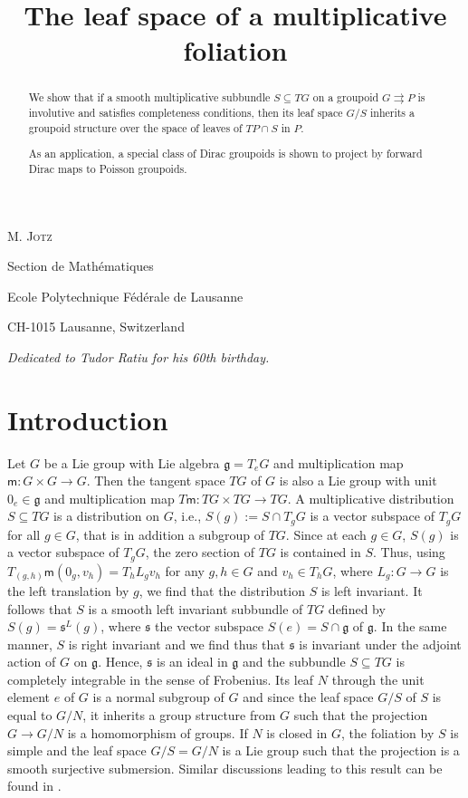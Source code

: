 \documentclass{amsart}
\title[The leaf space of a multiplicative foliation]
      {The leaf space of a multiplicative foliation}
\author[M. Jotz]{}
\theoremstyle{definition}
\begin{document}
\maketitle

\centerline{\scshape M. Jotz }
\medskip
{\footnotesize
 \centerline{Section de Math\'ematiques}
   \centerline{Ecole Polytechnique
  F{\'e}d{\'e}rale de Lausanne}
   \centerline{CH-1015 Lausanne, Switzerland}
}

\bigskip

\begin{abstract}
We show that if a smooth multiplicative subbundle
$S\subseteq TG$ on a groupoid $G{{\rightrightarrows}} P$ is involutive and  satisfies completeness conditions,
 then its leaf space
$G/S$ inherits a groupoid structure over the space  of leaves of $TP\cap S$ in $P$. 

As an application, a special class of Dirac groupoids is shown to
project by  forward Dirac maps to Poisson groupoids.
\end{abstract}

 

\begin{center}
\emph{Dedicated to Tudor Ratiu for his 60th birthday.}
\end{center}

\tableofcontents

\section{Introduction}
Let $G$ be a Lie group with Lie algebra ${\mathfrak{g}}=T_eG$ and multiplication map
$\mathsf m:G\times G\to G$. 
Then the tangent space $TG$ of $G$ is also a Lie group with unit $0_e\in{\mathfrak{g}}$
and  multiplication map $T\mathsf m:TG\times TG\to TG$. 
A multiplicative 
distribution $S\subseteq TG$ is a distribution on $G$, i.e., $S(g):=S\cap T_gG$ is a vector subspace of 
$T_gG$ for all $g\in G$,  that is in addition  a subgroup
of $TG$. Since at each $g\in G$, $S(g)$ is a vector 
subspace of $T_gG$, the zero section of $TG$ is contained in $S$. Thus,
using $T_{(g,h)}\mathsf m(0_g, v_h)=T_hL_gv_h$ for any $g,h\in G$ and
$v_h\in T_hG$, where $L_g:G\to G$ is the left translation by $g$, we find that the 
distribution $S$ is left invariant. It follows that $S$ is a smooth left invariant
 subbundle of $TG$
defined by $S(g)={\mathfrak{s}}^L(g)$, where ${\mathfrak{s}}$ the  vector subspace $S(e)=S\cap{\mathfrak{g}}$ of ${\mathfrak{g}}$. 
In the same manner, $S$ is right invariant 
and we find thus that ${\mathfrak{s}}$ is invariant under the adjoint action 
of $G$ on ${\mathfrak{g}}$. Hence, ${\mathfrak{s}}$ is an ideal in ${\mathfrak{g}}$
and the subbundle $S\subseteq TG$ is completely integrable
in the sense of Frobenius. Its leaf $N$ through the unit element $e$ of $G$ is a normal subgroup of $G$
and since the leaf space $G/S$ of $S$ is equal to $G/N$, it inherits 
a group structure from $G$ such that the projection $G\to G/N$ is a homomorphism of groups.
If $N$ is closed in $G$, the foliation by $S$ is simple
and the leaf space $G/S=G/N$ is a Lie group such that the projection is a smooth surjective submersion.
Similar discussions leading to this result can be found in \cite{Ortiz08,Jotz11a}.
\end{document}
